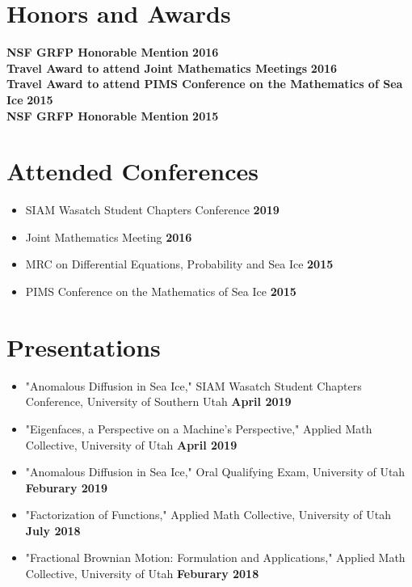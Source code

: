 \documentclass[margin,line]{res}
\begin{document}
\begin{resume}
\section{\sc Honors and Awards}
{\bf NSF GRFP Honorable Mention} \hfill {\bf 2016}\\
{\bf Travel Award to attend Joint Mathematics Meetings} \hfill {\bf 2016}\\
{\bf Travel Award to attend PIMS Conference on the Mathematics of Sea Ice} \hfill {\bf 2015}\\
{\bf NSF GRFP Honorable Mention} \hfill {\bf 2015}\\

\ifx\nopubs\undefined

\else
%
\fi

\section{\sc Attended Conferences}
\begin{itemize}
\item[] SIAM Wasatch Student Chapters Conference
\hfill {\bf 2019}
\item[] Joint Mathematics Meeting
\hfill {\bf 2016}
\item[] MRC on Differential Equations, Probability and Sea Ice
\hfill {\bf 2015}
\item[] PIMS Conference on the Mathematics of Sea Ice
\hfill {\bf 2015}
\end{itemize}

\section{\sc Presentations}
\begin{itemize}
\item[] "Anomalous Diffusion in Sea Ice," SIAM Wasatch Student Chapters Conference, University of Southern Utah
\hfill {\bf April 2019}
\item[] "Eigenfaces, a Perspective on a Machine's Perspective," Applied Math Collective, University of Utah
\hfill {\bf April 2019}
\item[] "Anomalous Diffusion in Sea Ice," Oral Qualifying Exam, University of Utah
\hfill {\bf Feburary 2019}
\item[] "Factorization of Functions," Applied Math Collective, University of Utah
\hfill {\bf July 2018}
\item[] "Fractional Brownian Motion: Formulation and Applications," Applied Math Collective, University of Utah
\hfill {\bf Feburary 2018}
\end{itemize}


\end{resume}
\end{document}
